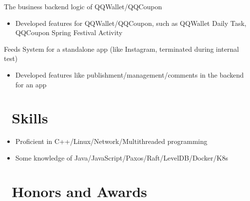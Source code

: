 \documentclass{resume}
\begin{document}
The business backend logic of QQWallet/QQCoupon
\begin{itemize}
  \item Developed features for QQWallet/QQCoupon, such as QQWallet Daily Task, QQCoupon Spring Festival Activity
\end{itemize}

Feeds System for a standalone app (like Instagram, terminated during internal test)
\begin{itemize}
  \item Developed features like publishment/management/comments in the backend for an app
\end{itemize}




\section{\faCogs\ Skills}
\begin{itemize}[parsep=0.5ex]
  \item Proficient in C++/Linux/Network/Multithreaded programming
  \item Some knowledge of Java/JavaScript/Paxos/Raft/LevelDB/Docker/K8s
\end{itemize}

\section{\faHeartO\ Honors and Awards}


%
%
\end{document}
